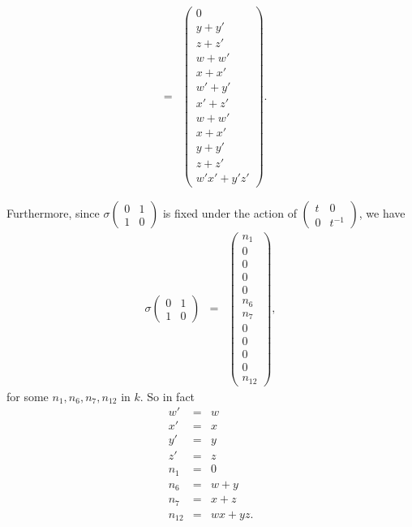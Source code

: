 \begin{eqnarray*}
&=&
\left(\begin{matrix}
0 \\
y + y' \\
z + z' \\
w + w' \\
x + x' \\
w' + y' \\
x' + z' \\
w + w' \\
x + x' \\
y + y' \\
z + z' \\
w'x' + y'z'
\end{matrix}\right).
\end{eqnarray*}

Furthermore, since $\sigma\left(\begin{matrix} 0 & 1 \\ 1 & 0\end{matrix}\right)$ is fixed under the action of $\left(\begin{matrix} t & 0 \\ 0 & t^{-1}\end{matrix}\right)$, we have
\begin{eqnarray*}
\sigma\left(\begin{matrix} 0 & 1 \\ 1 & 0\end{matrix}\right) &=&
\left(\begin{matrix}
n_1 \\
0 \\
0 \\
0 \\
0 \\
n_6 \\
n_7 \\
0 \\
0 \\
0 \\
0 \\
n_{12}
\end{matrix}\right),
\end{eqnarray*} 
for some $n_1, n_6, n_7, n_{12}$ in $k$. So in fact
\begin{eqnarray*}
w' &=& w \\
x' &=& x \\
y' &=& y \\
z' &=& z \\
n_1 &=& 0\\
n_6 &=&w+y\\
n_7 &=& x+z\\
n_{12} &=& wx + yz.
\end{eqnarray*}

